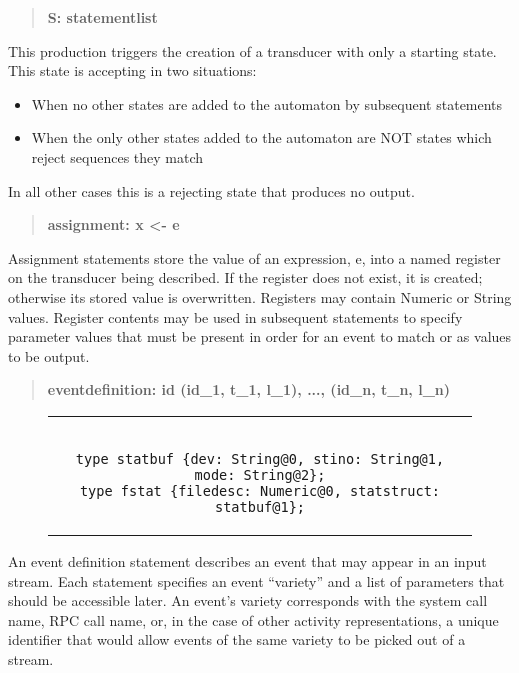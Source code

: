 \begin{quote}
\centering
\textbf{S: statementlist}
\end{quote}

This production triggers the creation of a transducer with only a starting
state.  This state is accepting in two situations:
\begin{itemize}
  \item{When no other states are added to the automaton by subsequent
    statements}
  \item{When the only other states added to the automaton are NOT states
    which reject sequences they match}
\end{itemize}
In all other cases this is a rejecting state that produces no output.

\begin{quote}
\centering
\textbf{assignment: x <- e}
\end{quote}

Assignment statements store the value of an expression, e, into a named
register on the transducer being described.
If the register does not exist,
it is created;
otherwise its stored value is overwritten.
Registers may contain Numeric or String values.  Register contents
may be used in subsequent statements to specify parameter values that must
be present in order for an event to match or as values to be output.

\begin{quote}
\centering
\textbf{eventdefinition: id (id\_1, t\_1, l\_1), ..., (id\_n, t\_n, l\_n) }
\end{quote}

\begin{figure}[H]
\centering
\begin{tabular}{c}
\begin{lstlisting}

type statbuf {dev: String@0, stino: String@1, mode: String@2};
type fstat {filedesc: Numeric@0, statstruct: statbuf@1};

\end{lstlisting}
\end{tabular}
\end{figure}

An event definition statement describes an event that may appear in an input
stream.  Each statement specifies an event ``variety'' and a list of
parameters that should be accessible later.  An event's variety corresponds
with the system call name, RPC call name, or, in the case of other activity
representations, a unique identifier that would allow events of the same
variety to be picked out of a stream.

